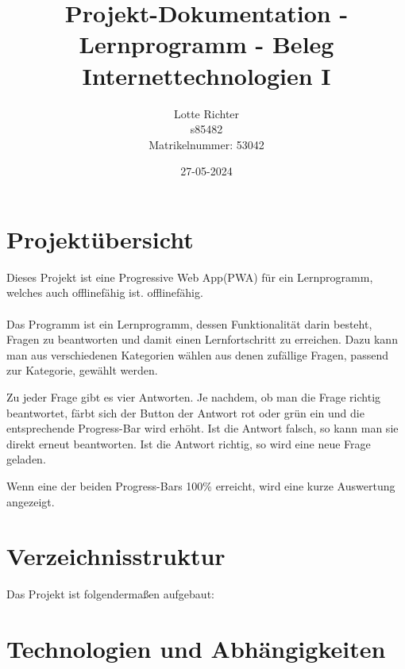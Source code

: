 \documentclass{article}
\title{Projekt-Dokumentation - Lernprogramm - Beleg Internettechnologien I}
\date{27-05-2024}
\author{Lotte Richter\\ s85482\\Matrikelnummer: 53042}
\begin{document}
  \maketitle
  \tableofcontents
  \newpage

\section{Projektübersicht}

Dieses Projekt ist eine Progressive Web App(PWA) für ein Lernprogramm, welches auch offlinefähig ist.
offlinefähig.\\\\
Das Programm ist ein Lernprogramm, dessen Funktionalität darin besteht, Fragen zu beantworten und damit einen Lernfortschritt zu erreichen.
Dazu kann man aus verschiedenen Kategorien wählen aus denen zufällige Fragen, passend zur Kategorie, gewählt werden.

Zu jeder Frage gibt es vier Antworten. Je nachdem, ob man die Frage richtig beantwortet, färbt sich der Button der Antwort rot oder grün ein
und die entsprechende Progress-Bar wird erhöht. Ist die Antwort falsch, so kann man sie direkt erneut beantworten. Ist die Antwort richtig, so wird
eine neue Frage geladen.

Wenn eine der beiden Progress-Bars 100\% erreicht, wird eine kurze Auswertung angezeigt.

\section{Verzeichnisstruktur}
Das Projekt ist folgendermaßen aufgebaut:\\


\section{Technologien und Abhängigkeiten}
\end{document}
